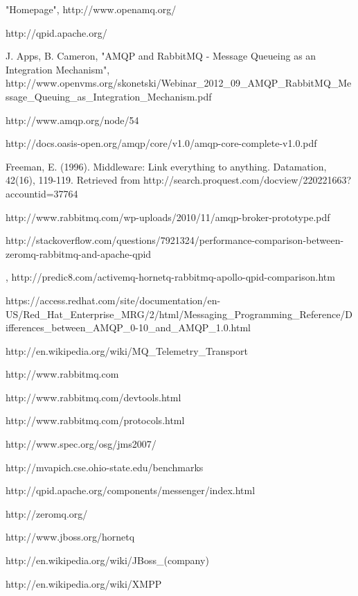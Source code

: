 \documentclass{thesis}
\begin{document}
\begin{singlespace}
\begin{thebibliography}{99}
 "Homepage", http://www.openamq.org/

 http://qpid.apache.org/

 J. Apps, B. Cameron, "AMQP and RabbitMQ - Message Queueing as an Integration Mechanism", http://www.openvms.org/skonetski/Webinar_2012_09_AMQP_RabbitMQ_Message_Queuing_as_Integration_Mechanism.pdf

 http://www.amqp.org/node/54

 http://docs.oasis-open.org/amqp/core/v1.0/amqp-core-complete-v1.0.pdf

 Freeman, E. (1996). Middleware: Link everything to anything. Datamation, 42(16), 119-119. Retrieved from http://search.proquest.com/docview/220221663?accountid=37764

 http://www.rabbitmq.com/wp-uploads/2010/11/amqp-broker-prototype.pdf

 http://stackoverflow.com/questions/7921324/performance-comparison-between-zeromq-rabbitmq-and-apache-qpid

 , http://predic8.com/activemq-hornetq-rabbitmq-apollo-qpid-comparison.htm

 https://access.redhat.com/site/documentation/en-US/Red_Hat_Enterprise_MRG/2/html/Messaging_Programming_Reference/Differences_between_AMQP_0-10_and_AMQP_1.0.html

 http://en.wikipedia.org/wiki/MQ_Telemetry_Transport

 http://www.rabbitmq.com

 http://www.rabbitmq.com/devtools.html

 http://www.rabbitmq.com/protocols.html

 http://www.spec.org/osg/jms2007/

 http://mvapich.cse.ohio-state.edu/benchmarks

 http://qpid.apache.org/components/messenger/index.html

 http://zeromq.org/

 http://www.jboss.org/hornetq

 http://en.wikipedia.org/wiki/JBoss_(company)

 http://en.wikipedia.org/wiki/XMPP


\end{thebibliography}
\end{singlespace}
\end{document}
